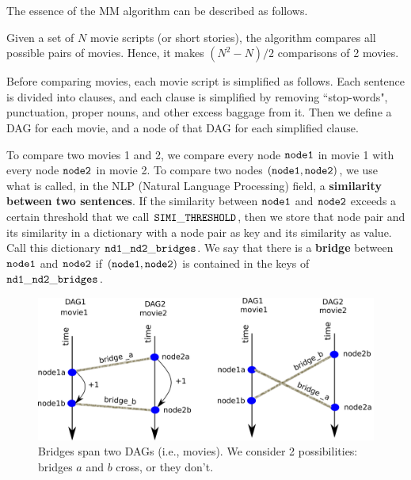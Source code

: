 \documentclass[12pt]{article}
\begin{document}
The essence of the MM algorithm can be described as follows.

Given a set of $N$ movie scripts (or short stories),
the algorithm compares all possible pairs of movies.
Hence, it makes $(N^2-N)/2$
 comparisons of 2 movies.

Before comparing movies, each movie script is simplified as follows.
Each sentence is divided into clauses,
and each clause is simplified by removing
``stop-words", punctuation, proper nouns, and other excess baggage from it.
Then we define a DAG for each movie, and a node of that DAG for each
simplified clause. 



To compare two movies 1 and 2,
we compare every node $\tt node1$
in movie 1 with every node $\tt node2$ in movie 2.
To compare two nodes $\tt (node1, node2)$,
we use what is called, in the NLP (Natural Language Processing)
field, a {\bf similarity between two sentences}. 
If the similarity
between $\tt node1$ and $\tt node2$ exceeds a certain threshold
that we call $\tt SIMI\_THRESHOLD$,
then we store that node pair and its
similarity in a dictionary with
a node pair as key and its similarity 
as value. Call this dictionary $\tt nd1\_nd2\_bridges$.
We say that there is a {\bf bridge} 
between $\tt node1$ and $\tt node2$
if $\tt (node1, node2)$ is contained 
in the keys of $\tt nd1\_nd2\_bridges$.

\begin{figure}[h!]
\centering
\includegraphics[width=5in]
{crossing-bridges.png}
\caption{Bridges span two DAGs (i.e., movies). We consider 2 possibilities:
bridges $a$ and $b$ cross,
or they don't. 
}
\label{fig-crossing-bridges}
\end{figure}
\end{document}
